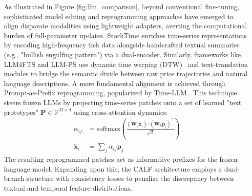 \documentclass[11pt,a4paper]{article}
\begin{document}
As illustrated in Figure \ref{fig:llm_comparison}, beyond conventional fine-tuning, sophisticated model editing and reprogramming approaches have emerged to align disparate modalities using lightweight adapters, averting the computational burden of full-parameter updates. StockTime \citep{wang2024stocktime} enriches time-series representations by encoding high-frequency tick data alongside handcrafted textual summaries (e.g., "bullish engulfing pattern") via a dual-encoder. Similarly, frameworks like LLM4FTS \citep{liu2025llm4fts} and LLM-PS \citep{tang2025llmps} use dynamic time warping (DTW)~\citep{sakoe1978dynamic} and text-translation modules to bridge the semantic divide between raw price trajectories and natural language descriptions. A more fundamental alignment is achieved through Prompt-as-Prefix reprogramming, popularized by Time-LLM \citep{jin2024timellm}. This technique steers frozen LLMs by projecting time-series patches onto a set of learned "text prototypes" $\mathbf{P} \in \mathbb{R}^{M \times d}$ using cross-attention dynamics:
\begin{align}
\alpha_{ij} &= \text{softmax} \left(\frac{(\mathbf{W}_q \mathbf{x}_i) \cdot (\mathbf{W}_k \mathbf{p}_j)^\top}{\sqrt{d}}\right) \\
\tilde{\mathbf{x}}_i &= \sum_j \alpha_{ij} \mathbf{p}_j
\end{align}
The resulting reprogrammed patches act as informative prefixes for the frozen language model. Expanding upon this, the CALF architecture \citep{liu2025calf} employs a dual-branch structure with consistency losses to penalize the discrepancy between textual and temporal feature distributions.
\end{document}
